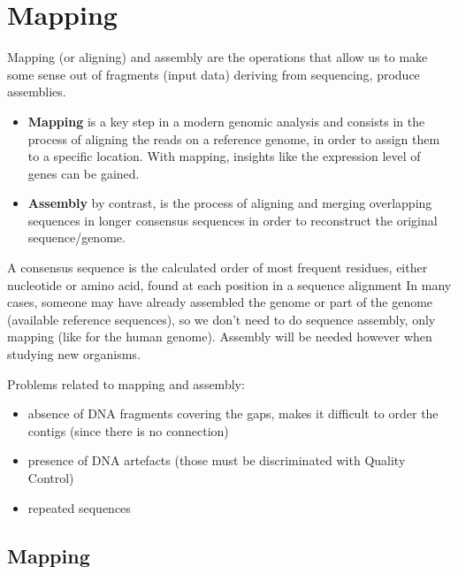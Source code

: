 \graphicspath{{chapters/images/05/}}

\chapter{Mapping}

Mapping (or aligning) and assembly are the operations that allow us to make some sense out of fragments (input data) deriving from sequencing, produce assemblies. 

\begin{itemize}
    \item \textbf{Mapping} is a key step in a modern genomic analysis and consists in the process of aligning the reads on a reference genome, in order to assign them to a specific location. With mapping, insights like the expression level of genes can be gained.
    \item \textbf{Assembly} by contrast, is the process of aligning and merging overlapping sequences in longer consensus sequences in order to reconstruct the original sequence/genome.
\end{itemize}

A consensus sequence is  the calculated order of most frequent residues, either nucleotide or amino acid, found at each position in a sequence alignment
In many cases, someone may have already assembled the genome or part of the genome (available reference sequences), so we don't need to do sequence assembly, only mapping (like for the human genome). Assembly will be needed however when studying new organisms. 

Problems related to mapping and assembly: 

\begin{itemize}
    \item absence of DNA fragments covering the gaps, makes it difficult to order the contigs (since there is no connection)
    \item presence of DNA artefacts (those must be discriminated with Quality Control)
    \item repeated sequences
\end{itemize}

\section{Mapping}

